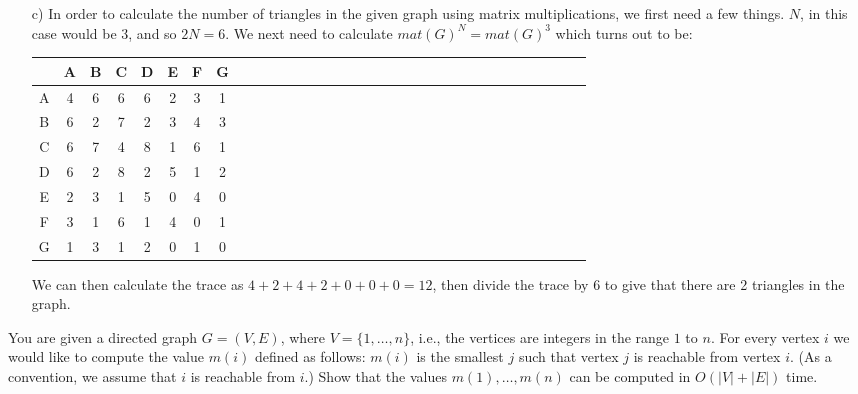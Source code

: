 \documentclass{article}
\begin{document}
\begin{solution}
\begin{itemize}
	\item[c)]{}  In order to calculate the number of triangles in the given graph using matrix multiplications, we first need a few things.  $N$, in this case would be 3, and so $2N = 6$.  We next need to calculate $mat(G)^N = mat(G)^3$ which turns out to be:
		\vskip 0.15in
		\begin{tabular}{|c|c|c|c|c|c|c|c|c|c|c|c|c|c|c|c|c|c|c|c|c|c|c|c|c|c|c|c|c|c|c|c|c}
			\hline
			   & A & B & C & D & E & F & G\\
			\hline
			 A & 4 & 6 & 6 & 6 & 2 & 3 & 1\\
			\hline
			 B & 6 & 2 & 7 & 2 & 3 & 4 & 3\\
			\hline
			 C & 6 & 7 & 4 & 8 & 1 & 6 & 1\\
			\hline
			 D & 6 & 2 & 8 & 2 & 5 & 1 & 2\\
			\hline
			 E & 2 & 3 & 1 & 5 & 0 & 4 & 0\\
			\hline
			 F & 3 & 1 & 6 & 1 & 4 & 0 & 1\\
			\hline
			 G & 1 & 3 & 1 & 2 & 0 & 1 & 0\\
			 \hline
		\end{tabular}
		\vskip 0.15in
		We can then calculate the trace as $4+2+4+2+0+0+0 = 12$, then divide the trace by 6 to give that there are 2 triangles in the graph.
\end{itemize}

\end{solution}




\begin{problem} 

You are given a directed graph $G = (V, E)$, where $V = \{1, \ldots , n\}$, i.e., the vertices are integers in the range $1$ to $n$. For every vertex $i$ we would like to compute the value $m(i)$ defined as follows: $m(i)$ is the smallest $j$ such that vertex $j$ is reachable from vertex $i$. (As a convention, we assume that $i$ is reachable from $i$.) Show that the values $m(1), \ldots , m(n)$ can be computed in $O(|V | + |E|)$ time.
\end{problem}
\begin{solution}
\end{solution}
\end{document}
